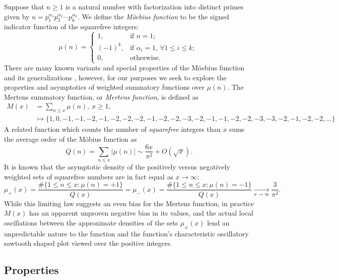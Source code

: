 \documentclass[11pt,reqno,a4letter]{article}
\numberwithin{figure}{section}
\numberwithin{table}{section}
\newcommand{\cf}{\textit{cf.\ }}
\newcommand{\seqnum}[1]{\href{http://oeis.org/#1}{\color{ProcessBlue}{\underline{#1}}}}
\theoremstyle{plain}
\numberwithin{theorem}{section}
\theoremstyle{definition}
\begin{document}
Suppose that $n \geq 1$ is a natural number with factorization into 
distinct primes given by 
$n = p_1^{\alpha_1} p_2^{\alpha_2} \cdots p_k^{\alpha_k}$. 
We define the \emph{M\"oebius function} to be the signed indicator function 
of the squarefree integers: 
\[
\mu(n) = \begin{cases} 
     1, & \text{if $n = 1$; } \\ 
     (-1)^k, & \text{if $\alpha_i = 1$, $\forall 1 \leq i \leq k$; } \\ 
     0, & \text{otherwise.} 
     \end{cases} 
\]
There are many known variants and special properties of the M\"oebius function 
and its generalizations \cite[\cf \S 2]{HANDBOOKNT-2004}, however, for our 
purposes we seek to explore the properties and asymptotics of weighted 
summatory functions over $\mu(n)$. 
The Mertens summatory function, or \emph{Mertens function}, is defined as 
\cite[\seqnum{A002321}]{OEIS} 
\begin{align*} 
M(x) & = \sum_{n \leq x} \mu(n),\ x \geq 1, \\ 
     & \longmapsto \{1, 0, -1, -1, -2, -1, -2, -2, -2, -1, -2, -2, -3, -2, 
     -1, -1, -2, -2, -3, -3, -2, -1, -2, -2, \ldots\}
\end{align*} 
A related function which counts the 
number of \emph{squarefree} integers than $x$ sums the average order of the M\"obius function as 
\cite[\seqnum{A013928}]{OEIS} 
\[ 
Q(n) = \sum_{n \leq x} |\mu(n)| \sim \frac{6x}{\pi^2} + O\left(\sqrt{x}\right). 
\] 
It is known that the asymptotic density of the positively versus negatively 
weighted sets of squarefree numbers are in fact equal as $x \rightarrow \infty$: 
\[
\mu_{+}(x) = \frac{\#\{1 \leq n \leq x: \mu(n) = +1\}}{Q(x)} = 
     \mu_{-}(x) = \frac{\#\{1 \leq n \leq x: \mu(n) = -1\}}{Q(x)} 
     \xrightarrow[x \rightarrow \infty]{} \frac{3}{\pi^2}. 
\]
While this limiting law suggests an even bias for the Mertens function, 
in practice $M(x)$ has an apparent unproven negative bias in its values, and the actual 
local oscillations between the approximate densities of the sets 
$\mu_{\pm}(x)$ lend an unpredictable nature to the function and the function's 
characteristic oscillatory sawtooth shaped plot viewed over the positive integers. 

\subsection{Properties} 
\end{document}
